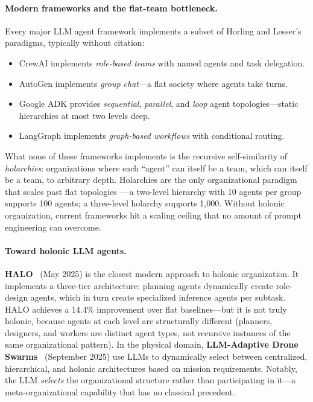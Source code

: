 \documentclass{article}
\begin{document}
\paragraph{Modern frameworks and the flat-team bottleneck.}
Every major LLM agent framework implements a subset of Horling and Lesser's paradigms,
typically without citation:
\begin{itemize}[nosep]
  \item CrewAI implements \emph{role-based teams} with named agents and task delegation.
  \item AutoGen implements \emph{group chat}---a flat society where agents take turns.
  \item Google ADK provides \emph{sequential}, \emph{parallel}, and \emph{loop} agent
    topologies---static hierarchies at most two levels deep.
  \item LangGraph implements \emph{graph-based workflows} with conditional routing.
\end{itemize}
What none of these frameworks implements is the recursive self-similarity of
\emph{holarchies}: organizations where each ``agent'' can itself be a team, which can
itself be a team, to arbitrary depth. Holarchies are the only organizational paradigm
that scales past flat topologies~\citep{horling2004survey}---a two-level hierarchy
with 10 agents per group supports 100 agents; a three-level holarchy supports 1,000.
Without holonic organization, current frameworks hit a scaling ceiling that no amount
of prompt engineering can overcome.

\paragraph{Toward holonic LLM agents.}
\textbf{HALO}~\citep{halo2025} (May 2025) is the closest modern approach to holonic
organization. It implements a three-tier architecture: planning agents dynamically create
role-design agents, which in turn create specialized inference agents per subtask. HALO
achieves a 14.4\% improvement over flat baselines---but it is not truly holonic, because
agents at each level are structurally different (planners, designers, and workers are
distinct agent types, not recursive instances of the same organizational pattern).
In the physical domain, \textbf{LLM-Adaptive Drone Swarms}~\citep{llmdrone2025}
(September 2025) use LLMs to dynamically select between centralized, hierarchical,
and holonic architectures based on mission requirements. Notably, the LLM \emph{selects}
the organizational structure rather than participating in it---a meta-organizational
capability that has no classical precedent.
\end{document}
